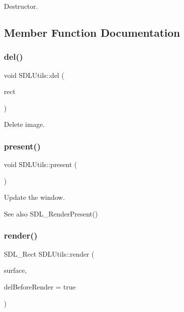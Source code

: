 Destructor. 



\subsection{Member Function Documentation}
\mbox{\label{class_s_d_l_utils_a8dfdc8f41938c2c53ac5121c10eb1638}} 
\subsubsection{\texorpdfstring{del()}{del()}}
{\footnotesize\ttfamily void S\+D\+L\+Utils\+::del (\begin{DoxyParamCaption}\item[{S\+D\+L\+\_\+\+Rect}]{rect }\end{DoxyParamCaption})\hspace{0.3cm}{\ttfamily [virtual]}}



Delete image. 

\mbox{\label{class_s_d_l_utils_a0e9c4b007ae61772a1c41592877b30ab}} 
\subsubsection{\texorpdfstring{present()}{present()}}
{\footnotesize\ttfamily void S\+D\+L\+Utils\+::present (\begin{DoxyParamCaption}{ }\end{DoxyParamCaption})\hspace{0.3cm}{\ttfamily [virtual]}}



Update the window. 

\begin{DoxySeeAlso}{See also}
S\+D\+L\+\_\+\+Render\+Present() 
\end{DoxySeeAlso}
\mbox{\label{class_s_d_l_utils_a5b0a6dd7f5f0b8bd7a06527c39d8a666}} 
\subsubsection{\texorpdfstring{render()}{render()}}
{\footnotesize\ttfamily S\+D\+L\+\_\+\+Rect S\+D\+L\+Utils\+::render (\begin{DoxyParamCaption}\item[{\mbox{\hyperlink{class_i_surface}{I\+Surface}} $\ast$}]{surface,  }\item[{bool}]{del\+Before\+Render = {\ttfamily true} }\end{DoxyParamCaption})\hspace{0.3cm}{\ttfamily [virtual]}}



